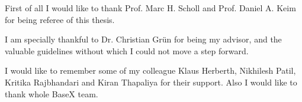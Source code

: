 First of all I would like to thank Prof. Marc H. Scholl and Prof. Daniel A. Keim for being referee of this thesis. 

I am specially thankful to Dr. Christian Gr\"{u}n for being my advisor, and the valuable guidelines without which I could not move a step forward.

I would like to remember some of my colleague Klaus Herberth,  Nikhilesh Patil, Kritika Rajbhandari and Kiran Thapaliya for their support.  Also I would like to thank whole BaseX team. 